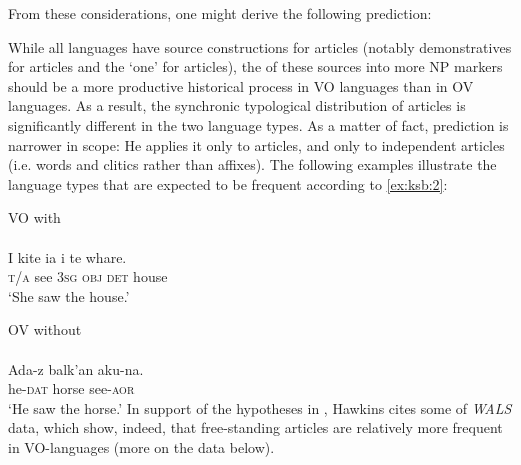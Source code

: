 \documentclass[output=paper]{langsci/langscibook}
\begin{document}
From these considerations, one might derive the following prediction:

\eanoraggedright
{While all languages have source constructions for articles (notably demonstratives for  articles and the  ‘one’ for  articles), the  of these sources into more  NP markers should be a more productive historical process in VO languages than in OV languages. As a result, the synchronic typological distribution of articles is significantly different in the two language types.}
\z
\noindent As a matter of fact,  prediction is narrower in scope: He applies it only to  articles, and only to independent  articles (i.e. words and clitics rather than affixes). The following examples illustrate the language types that are expected to be frequent according to \ref{ex:ksb:2}:

\ea\label{ex:ksb:2}
\ea  VO with  \\
\\
\gll I kite ia i te whare.\\
     \textsc{t/a}   see 3\textsc{sg}   \textsc{obj}   \textsc{det}   house\\
\glt ‘She saw the house.’

\ex
 OV without  \\ 
\\
\gll Ada-z  balk’an   aku-na.\\
     he-\textsc{dat}   horse     see-\textsc{aor}\\
\glt ‘He saw the horse.’
\z
\z\newpage
\noindent In support of the hypotheses in , Hawkins cites some of  \textit{WALS} data, which show, indeed, that free-standing  articles are relatively more frequent in VO-languages (more on the data below).
\end{document}
